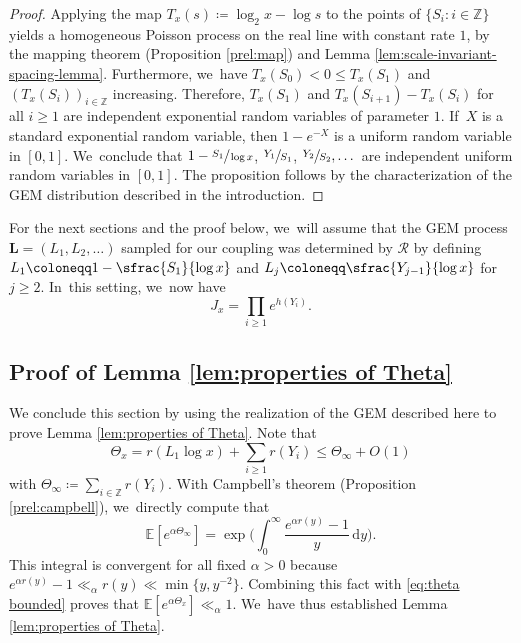\documentclass[10pt]{amsart}
\newcommand{\bL}{{\boldsymbol L}}
\newcommand{\ZZ}{\mathbb{Z}}
\newcommand{\EE}{\mathbb{E}}
\newcommand{\RS}{\mathscr{R}}
\newcommand{\bggg}{\bigg}
\theoremstyle{plain}
\theoremstyle{definition}
\begin{document}
\begin{proof}
Applying the map $T_x(s) \coloneqq \log_2 x - \log s$ to the points of \hbox{$\{S_i : i \in \ZZ\}$} yields a homogeneous Poisson process on the real line with constant rate $1$, by the mapping theorem (Proposition \ref{prel:map}) and Lemma \ref{lem:scale-invariant-spacing-lemma}. Furthermore, we~have \hbox{$T_x(S_0) \!<\! 0 \!\le\! T_x(S_1)$} and $(T_x(S_i))_{i \in \ZZ}$ increasing. Therefore, $T_x(S_1)$ and \hbox{$T_x(S_{i+1}) \!-\! T_x(S_i)$} for all $i \ge 1$ are independent exponential random variables of parameter $1$. If~$X$ is a standard exponential random variable, then $1-e^{-X}$ is a uniform random variable in $[0, 1]$. We~conclude that $1-\sfrac{S_1}{\log x}$, $\sfrac{Y_1}{S_1}$, $\sfrac{Y_2}{S_2},\dots$ are independent uniform random variables in $[0, 1]$. The proposition follows by the characterization of the GEM distribution described in the introduction.
\end{proof}

For the next sections and the proof below, we~will assume that the GEM process $\bL = (L_1, L_2, \ldots)$ sampled for our coupling was determined by $\RS$ by defining \hbox{$L_1 \coloneqq 1-\sfrac{S_1}{\log x}$} and $L_j \coloneqq \sfrac{Y_{j-1}}{\log x}$ for $j \ge 2$. In~this setting, we~now have
\begin{equation}
\label{eq:J_x alternative definition}
J_x = \prod_{i \ge 1} e^{h(Y_i)}.
\end{equation}

\subsection{Proof of Lemma \ref{lem:properties of Theta}}
We conclude this section by using the realization of the GEM described here to prove Lemma \ref{lem:properties of Theta}. Note that
\begin{equation}
\label{eq:theta bounded}
\Theta_x = r(L_1\log x) + \sum_{i \ge 1} r(Y_i) \le \Theta_\infty + O(1)
\end{equation}
with $\Theta_\infty \coloneqq \sum_{i \in \ZZ} r(Y_i)$. With Campbell's theorem (Proposition \ref{prel:campbell}), we~directly compute that
\begin{equation}
\label{eq:mgf theta infty}
\EE[e^{\alpha \Theta_\infty}] = \exp\!\bggg(\!\int_{0}^\infty \frac{e^{\alpha r(y)} - 1}{y}\, \mathrm dy\bggg).
\end{equation}
This integral is convergent for all fixed $\alpha \!>\! 0$ because $e^{\alpha r(y)} -1 \!\ll_\alpha\! r(y) \!\ll\!\min\{y,y^{-2}\}$. Combining this fact with \eqref{eq:theta bounded} proves that $\EE[e^{\alpha \Theta_x}] \ll_\alpha 1$. We~have thus established Lemma \ref{lem:properties of Theta}.
\end{document}
